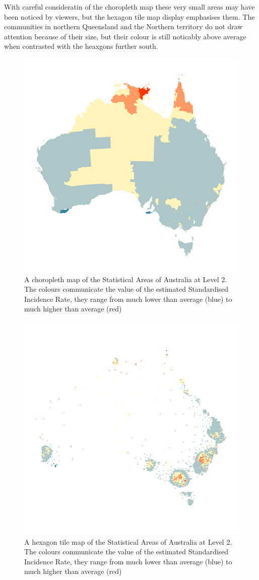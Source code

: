 \documentclass[
]{jss}
\begin{document}
With careful consideratin of the choropleth map these very small areas
may have been noticed by viewers, but the hexagon tile map display
emphasises them. The communities in northern Queensland and the Northern
territory do not draw attention because of their size, but their colour
is still noticably above average when contrasted with the heaxgons
further south.

\begin{figure}

{\centering \includegraphics[width=0.6\linewidth]{figures/aus_liver_m} 

}

\caption[A choropleth map of the Statistical Areas of Australia at Level 2]{A choropleth map of the Statistical Areas of Australia at Level 2. The colours communicate the value of the estimated Standardised Incidence Rate, they range from much lower than average (blue) to much higher than average (red)}\label{fig:liver-geo}
\end{figure}

\begin{figure}

{\centering \includegraphics[width=0.6\linewidth]{figures/aus_liver_m_hex} 

}

\caption[A hexagon tile map of the Statistical Areas of Australia at Level 2]{A hexagon tile map of the Statistical Areas of Australia at Level 2. The colours communicate the value of the estimated Standardised Incidence Rate, they range from much lower than average (blue) to much higher than average (red)}\label{fig:liver-hex}
\end{figure}
\end{document}
